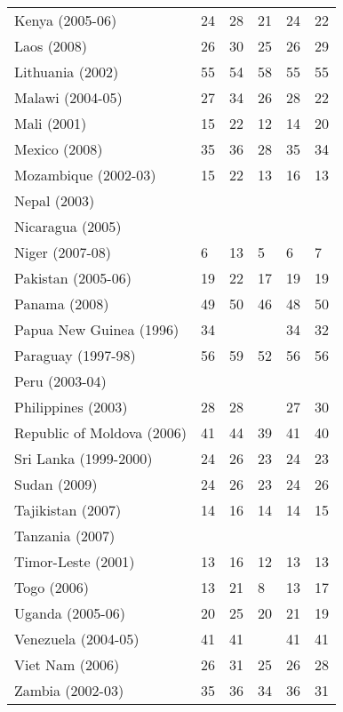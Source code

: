 \begin{tabular}{L{2.0cm} R{0.7cm} R{0.7cm} R{0.7cm} R{0.7cm} R{0.7cm}}
        Kenya (2005-06) & 24 & 28 & 21 & 24 & 22 \\
        Laos (2008) & 26 & 30 & 25 & 26 & 29 \\
        Lithuania (2002) & 55 & 54 & 58 & 55 & 55 \\
        Malawi (2004-05) & 27 & 34 & 26 & 28 & 22 \\
        Mali (2001) & 15 & 22 & 12 & 14 & 20 \\
        Mexico (2008) & 35 & 36 & 28 & 35 & 34 \\
        Mozambique (2002-03) & 15 & 22 & 13 & 16 & 13 \\
        Nepal (2003) &  &  &  &  &  \\
        Nicaragua (2005) &  &  &  &  &  \\
        Niger (2007-08) & 6 & 13 & 5 & 6 & 7 \\
        Pakistan (2005-06) & 19 & 22 & 17 & 19 & 19 \\
        Panama (2008) & 49 & 50 & 46 & 48 & 50 \\
        Papua New Guinea (1996) & 34 &  &  & 34 & 32 \\
        Paraguay (1997-98) & 56 & 59 & 52 & 56 & 56 \\
        Peru (2003-04) &  &  &  &  &  \\
        Philippines (2003) & 28 & 28 &  & 27 & 30 \\
        Republic of Moldova (2006) & 41 & 44 & 39 & 41 & 40 \\
        Sri Lanka (1999-2000) & 24 & 26 & 23 & 24 & 23 \\
        Sudan (2009) & 24 & 26 & 23 & 24 & 26 \\
        Tajikistan (2007) & 14 & 16 & 14 & 14 & 15 \\
        Tanzania (2007) &  &  &  &  &  \\
        Timor-Leste (2001) & 13 & 16 & 12 & 13 & 13 \\
        Togo (2006) & 13 & 21 & 8 & 13 & 17 \\
        Uganda (2005-06) & 20 & 25 & 20 & 21 & 19 \\
        Venezuela (2004-05) & 41 & 41 &  & 41 & 41 \\
        Viet Nam (2006) & 26 & 31 & 25 & 26 & 28 \\
        Zambia (2002-03) & 35 & 36 & 34 & 36 & 31 \\
       \toprule
      \end{tabular}
\clearpage

\begin{multicols}{2}

}{}

\IfFileExists{./Plots/C.P1.HS.1.10.pdf}{\texttt{[image: \{./Plots/C.P1.HS.1.10]}.pdf}}{}
\end{multicols}
\clearpage

